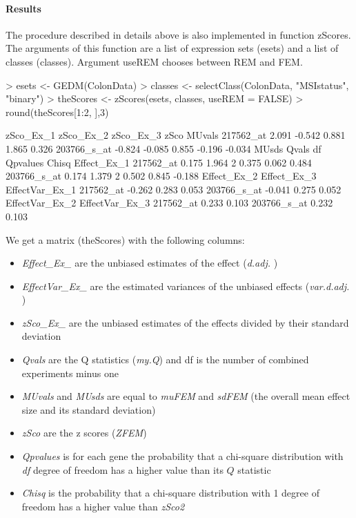 \documentclass[a4paper]{report}
\begin{document}
\paragraph{Results}
The procedure described in details above is also implemented in function {\ttfamily zScores}. The arguments of this function are a list of expression sets ({\ttfamily esets}) and a list of classes ({\ttfamily classes}). Argument {\ttfamily useREM} chooses between REM and FEM. 
\begin{Schunk}
\begin{Sinput}
> esets <- GEDM(ColonData)
> classes <- selectClass(ColonData, "MSIstatus", "binary")
> theScores <- zScores(esets, classes, useREM = FALSE)
> round(theScores[1:2, ],3)
\end{Sinput}
\begin{Soutput}
            zSco_Ex_1 zSco_Ex_2 zSco_Ex_3   zSco MUvals
217562_at       2.091    -0.542     0.881  1.865  0.326
203766_s_at    -0.824    -0.085     0.855 -0.196 -0.034
            MUsds Qvals df Qpvalues Chisq Effect_Ex_1
217562_at   0.175 1.964  2    0.375 0.062       0.484
203766_s_at 0.174 1.379  2    0.502 0.845      -0.188
            Effect_Ex_2 Effect_Ex_3 EffectVar_Ex_1
217562_at        -0.262       0.283          0.053
203766_s_at      -0.041       0.275          0.052
            EffectVar_Ex_2 EffectVar_Ex_3
217562_at            0.233          0.103
203766_s_at          0.232          0.103
\end{Soutput}
\end{Schunk}
We get a matrix ({\ttfamily theScores}) with the following columns:
\begin{itemize}
\item \emph{Effect\_Ex\_ } are the unbiased estimates of the effect (\emph{d.adj. })
\item \emph{EffectVar\_Ex\_ } are the estimated variances of the unbiased effects (\emph{var.d.adj. })
\item \emph{zSco\_Ex\_} are the unbiased estimates of the effects divided by their standard deviation 
\item \emph{Qvals} are the Q statistics (\emph{my.Q}) and df is the number of combined experiments minus one
\item \emph{MUvals} and \emph{MUsds} are equal to \emph{muFEM} and \emph{sdFEM} (the overall mean effect size and its standard deviation) 
\item \emph{zSco} are the z scores (\emph{ZFEM})
\item \emph{Qpvalues} is for each gene the probability that a chi-square distribution with \emph{df} degree of freedom has a higher value than its $Q$ statistic
\item \emph{Chisq} is the probability that a chi-square distribution with 1 degree of freedom has a higher value than \emph{zSco2}
\end{itemize}
\end{document}
